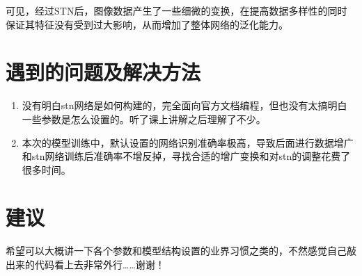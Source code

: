 \documentclass[a4paper]{article}
\begin{document}
\begin{enumerate}
\begin{enumerate}
        可见，经过STN后，图像数据产生了一些细微的变换，在提高数据多样性的同时保证其特征没有受到过大影响，从而增加了整体网络的泛化能力。

    \end{enumerate}

    


\end{enumerate}


\section{遇到的问题及解决方法}
    \begin{enumerate}
        \item 没有明白stn网络是如何构建的，完全面向官方文档编程，但也没有太搞明白一些参数是怎么设置的。听了课上讲解之后理解了不少。
        \item 本次的模型训练中，默认设置的网络识别准确率极高，导致后面进行数据增广和stn网络训练后准确率不增反掉，寻找合适的增广变换和对stn的调整花费了很多时间。
    \end{enumerate}

\section{建议}
希望可以大概讲一下各个参数和模型结构设置的业界习惯之类的，不然感觉自己敲出来的代码看上去非常外行……谢谢！
\end{document}
